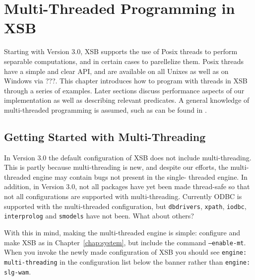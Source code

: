 \chapter{Multi-Threaded Programming in XSB} \label{chap:threads}

Starting with Version 3.0, XSB supports the use of Posix threads to
perform separable computations, and in certain cases to parellelize
them.  Posix threads have a simple and clear API, and are available on
all Unixes as well as on Windows via ???.  This chapter introduces how
to program with threads in XSB through a series of examples.  Later
sections discuss performance aspects of our implementation as well as
describing relevant predicates.  A general knowledge of multi-threaded
programming is assumed, such as can be found in \cite{LewB98,Bute97}.

\section{Getting Started with Multi-Threading}
%
In Version 3.0 the default configuration of XSB does not include
multi-threading.  This is partly because multi-threading is new, and
despite our efforts, the multi-threaded engine may contain bugs not
present in the single-
threaded engine.  In addition, in Version 3.0,
not all packages have yet been made thread-safe so that not all
configurations are supported with multi-threading.  Currently ODBC is
supported with the multi-threaded configuration, but {\tt dbdrivers},
{\tt xpath}, {\tt iodbc}, {\tt interprolog} and {\tt smodels} have not
been. {\sc What about others?}

With this in mind, making the multi-threaded engine is simple:
configure and make XSB as in Chapter~\ref{chap:system}, but include
the command {\tt --enable-mt}.  When you invoke the newly made
configuration of XSB you should see {\tt engine: multi-threading} in
the configuration list below the banner rather than {\tt engine:
  slg-wam}.

